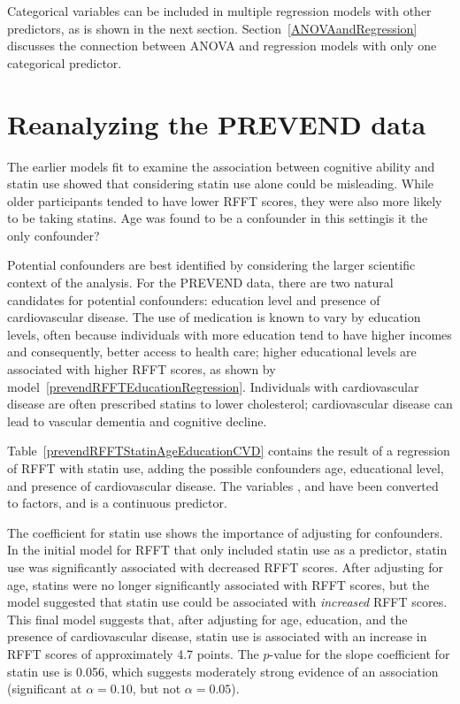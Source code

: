 Categorical variables can be included in multiple regression models with other predictors, as is shown in the next section. Section~\ref{ANOVAandRegression} discusses the connection between ANOVA and regression models with only one categorical predictor.



\newpage

\section{Reanalyzing the PREVEND data}
\label{reanalyzingStatinDataSet}

The earlier models fit to examine the association between cognitive ability and statin use showed that considering statin use alone could be misleading. While older participants tended to have lower RFFT scores, they were also more likely to be taking statins. Age was found to be a confounder in this setting\textemdash is it the only confounder?

Potential confounders are best identified by considering the larger scientific context of the analysis. For the PREVEND data, there are two natural candidates for potential confounders: education level and presence of cardiovascular disease. The use of medication is known to vary by education levels, often because individuals with more education tend to have higher incomes and consequently, better access to health care; higher educational levels are associated with higher RFFT scores, as shown by model~\ref{prevendRFFTEducationRegression}. Individuals with cardiovascular disease are often prescribed statins to lower cholesterol; cardiovascular disease can lead to vascular dementia and cognitive decline.

Table~\ref{prevendRFFTStatinAgeEducationCVD} contains the result of a regression of RFFT with statin use, adding the possible confounders age, educational level, and presence of cardiovascular disease. The variables ,  and  have been converted to factors, and  is a continuous predictor.

The coefficient for statin use shows the importance of adjusting for confounders.  In the initial model for RFFT that only included statin use as a predictor, statin use was significantly associated with decreased RFFT scores. After adjusting for age, statins were no longer significantly associated with RFFT scores, but the model suggested that statin use could be associated with \emph{increased} RFFT scores. This final model suggests that, after adjusting for age, education, and the presence of cardiovascular disease, statin use is associated with an increase in RFFT scores of approximately 4.7 points. The $p$-value for the slope coefficient for statin use is 0.056, which suggests moderately strong evidence of an association (significant at $\alpha = 0.10$, but not $\alpha = 0.05$).

